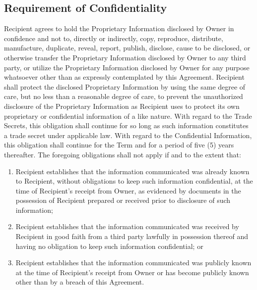 \documentclass[letterpaper,10pt,english]{sphinxmanual}
\begin{document}
\subsection{Requirement of Confidentiality}
\label{\detokenize{nondisclosure:requirement-of-confidentiality}}
Recipient agrees to hold the Proprietary Information disclosed by Owner in confidence and not to, directly or indirectly, copy, reproduce, distribute, manufacture, duplicate, reveal, report, publish, disclose, cause to be disclosed, or otherwise transfer the Proprietary Information disclosed by Owner to any third party, or utilize the Proprietary Information disclosed by Owner for any purpose whatsoever other than as expressly contemplated by this Agreement. Recipient shall protect the disclosed Proprietary Information by using the same degree of care, but no less than a reasonable degree of care, to prevent the unauthorized disclosure of the Proprietary Information as Recipient uses to protect its own proprietary or confidential information of a like nature.  With regard to the Trade Secrets, this obligation shall continue for so long as such information constitutes a trade secret under applicable law. With regard to the Confidential Information, this obligation shall continue for the Term and for a period of five (5) years thereafter. The foregoing obligations shall not apply if and to the extent that:
\begin{enumerate}
\item {} 
Recipient establishes that the information communicated was already known to Recipient, without obligations to keep such information confidential, at the time of Recipient’s receipt from Owner, as evidenced by documents in the possession of Recipient prepared or received prior to disclosure of such information;

\item {} 
Recipient establishes that the information communicated was received by Recipient in good faith from a third party lawfully in possession thereof and having no obligation to keep such information confidential; or

\item {} 
Recipient establishes that the information communicated was publicly known at the time of Recipient’s receipt from Owner or has become publicly known other than by a breach of this Agreement.

\end{enumerate}
\end{document}
